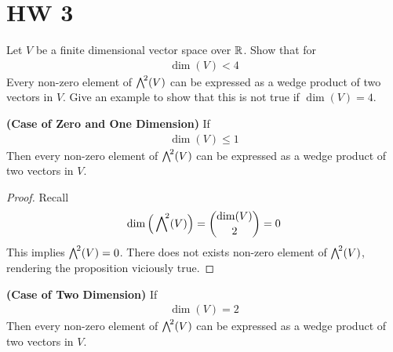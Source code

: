 \documentclass{report}
\begin{document}
\section{HW 3}
\begin{question}{}{}
Let $V$ be a finite dimensional vector space over $\mathbb{R}$. Show that for 
 \begin{align*}
\operatorname{dim}(V)<4
\end{align*}
Every non-zero element of $\extp^2(V)$ can be expressed as a wedge product of two vectors in $V$.  Give an example to show that this is not true if $\operatorname{dim}(V)=4$. 
\end{question}
\begin{theorem}
\textbf{(Case of Zero and One Dimension)} If 
\begin{align*}
\operatorname{dim}(V)\leq 1
\end{align*}
Then every non-zero element of $\extp^2(V)$ can be expressed as a wedge product of two vectors in $V$. 
\end{theorem}
\begin{proof}
Recall
\begin{align*}
\operatorname{dim}\Big( \extp^2(V) \Big)= \binom{\operatorname{dim}(V)}{2}=0
\end{align*}
This implies $\extp^2(V)=0$. There does not exists non-zero element of $\extp^2(V)$, rendering the proposition viciously true. 
\end{proof}
\begin{theorem}
\textbf{(Case of Two Dimension)} If 
\begin{align*}
\operatorname{dim}(V)=2
\end{align*}
Then every non-zero element of $\extp^2(V)$ can be expressed as a wedge product of two vectors in $V$. 
\end{theorem}
\end{document}
